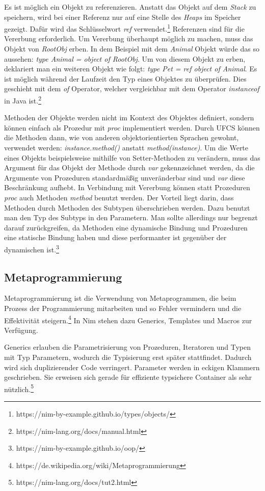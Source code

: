 \documentclass[11pt]{report}
\begin{document}
Es ist möglich ein Objekt zu referenzieren. Anstatt das Objekt auf dem \emph{Stack} zu speichern, wird bei einer Referenz nur auf eine Stelle des \emph{Heaps} im Speicher gezeigt. Dafür wird das Schlüsselwort \emph{ref} verwendet.\footnote{https://nim-by-example.github.io/types/objects/}
Referenzen sind für die Vererbung erforderlich. Um Vererbung überhaupt möglich zu machen, muss das Objekt von \emph{RootObj} erben. In dem Beispiel mit dem \emph{Animal} Objekt würde das so aussehen: \emph{type Animal = object of RootObj}. Um von diesem Objekt zu erben, deklariert man ein weiteren Objekt wie folgt: \emph{type Pet = ref object of Animal}.
Es ist möglich während der Laufzeit den Typ eines Objektes zu überprüfen.
Dies geschieht mit dem \emph{of} Operator, welcher vergleichbar mit dem Operator \emph{instanceof} in Java ist.\footnote{https://nim-lang.org/docs/manual.html}

Methoden der Objekte werden nicht im Kontext des Objektes definiert, sondern können einfach als Prozedur mit \emph{proc} implementiert werden. Durch UFCS können die Methoden dann, wie von anderen objektorientierten Sprachen gewohnt, verwendet werden: \emph{instance.method()} anstatt \emph{method(instance)}.
Um die Werte eines Objekts beispielsweise mithilfe von Setter-Methoden zu verändern, muss das Argument für das Objekt der Methode durch \emph{var} gekennzeichnet werden, da die Argumente von Prozeduren standardmäßig unveränderbar sind und \emph{var} diese Beschränkung aufhebt.
In Verbindung mit Vererbung können statt Prozeduren \emph{proc} auch Methoden \emph{method} benutzt werden. Der Vorteil liegt darin, dass Methoden durch Methoden des Subtypen überschrieben werden. Dazu benutzt man den Typ des Subtyps in den Parametern. Man sollte allerdings nur begrenzt darauf zurückgreifen, da Methoden eine dynamische Bindung und Prozeduren eine statische Bindung haben und diese performanter ist gegenüber der dynamischen ist.\footnote{https://nim-by-example.github.io/oop/}


\subsection{Metaprogrammierung}
Metaprogrammierung ist die Verwendung von Metaprogrammen, die beim Prozess der Programmierung mitarbeiten und so Fehler vermindern und die Effektivität steigern.\footnote{https://de.wikipedia.org/wiki/Metaprogrammierung} In Nim stehen dazu Generics, Templates und Macros zur Verfügung.

Generics erlauben die Parametrisierung von Prozeduren, Iteratoren und Typen mit Typ Parametern, wodurch die Typisierung erst später stattfindet. Dadurch wird sich duplizierender Code verringert. Parameter werden in eckigen Klammern geschrieben. Sie erweisen sich gerade für effiziente typsichere Container als sehr nützlich.\footnote{https://nim-lang.org/docs/tut2.html}
\end{document}
